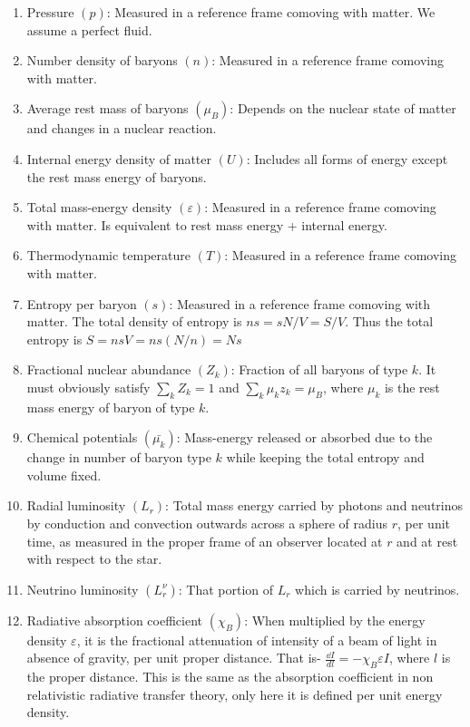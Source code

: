 \documentclass[12pt, letterpaper]{report}
\begin{document}
\begin{enumerate}
    \item Pressure $(p)$: Measured in a reference frame comoving with matter. We assume a perfect fluid. 
    \item Number density of baryons $(n)$: Measured in a reference frame comoving with matter. 
    \item Average rest mass of baryons $(\mu_B)$: Depends on the nuclear state of matter and changes in a nuclear reaction. 
    \item Internal energy density of matter $(U)$: Includes all forms of energy except the rest mass energy of baryons.
    \item Total mass-energy density $(\varepsilon)$: Measured in a reference frame comoving with matter. Is equivalent to rest mass energy + internal energy. 
    \item Thermodynamic temperature $(T)$: Measured in a reference frame comoving with matter.
    \item Entropy per baryon $(s)$: Measured in a reference frame comoving with matter. The total density of entropy is $ns= sN/V= S/V$. Thus the total entropy is $S= nsV= ns(N/n)= Ns$
    \item Fractional nuclear abundance $(Z_k)$: Fraction of all baryons of type $k$. It must obviously satisfy $\sum_k Z_k= 1$ and $\sum_k \mu_k z_k= \mu_B$, where $\mu_k$ is the rest mass energy of baryon of type $k$. 
    \item Chemical potentials $(\bar{\mu_k})$: Mass-energy released or absorbed due to the change in number of baryon type $k$ while keeping the total entropy and volume fixed. 
    \item Radial luminosity $(L_r)$: Total mass energy carried by photons and neutrinos by conduction and convection outwards across a sphere of radius $r$, per unit time, as measured in the proper frame of an observer located at $r$ and at rest with respect to the star. 
    \item Neutrino luminosity $(L_r^\nu)$: That portion of $L_r$ which is carried by neutrinos. 
    \item Radiative absorption coefficient $(\chi_B)$: When multiplied by the energy density $\varepsilon$, it is the fractional attenuation of intensity of a beam of light in absence of gravity, per unit proper distance. That is- $\frac{\dd I}{dl}= -\chi_B\varepsilon I$, where $l$ is the proper distance. This is the same as the absorption coefficient in non relativistic radiative transfer theory, only here it is defined per unit energy density. 

\end{enumerate}
\end{document}
